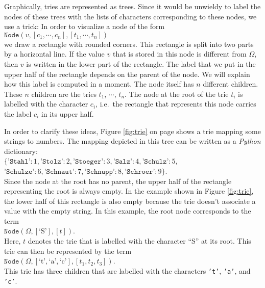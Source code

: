 Graphically, tries are represented as trees.  Since it would be unwieldy to label the nodes of these
trees with the lists of characters corresponding to these nodes, we use a trick:  In order to
visualize a node of the form \\[0.2cm]
\hspace*{1.3cm} 
$\texttt{Node}(v, [c_1, \cdots, c_n], [t_1, \cdots, t_n])$ \\[0.2cm]
we draw a rectangle with rounded corners.  This rectangle is split into two parts by a horizontal line.
If the value  $v$ that is stored in this node is different from $\Omega$, then $v$ is
written in the lower part of the rectangle.  The label that we put in the upper half of the rectangle
depends on the parent of the node.  We will explain how this label is computed in a moment.
The node itself has $n$ different children.  These $n$ children are the tries
$t_1$, $\cdots$, $t_n$.  The node at the root of the trie $t_i$ is labelled with the character $c_i$,
i.e.~the rectangle that represents this node carries the label $c_i$ in its upper half.

In order to clarify these ideas, Figure  \ref{fig:trie} on page \pageref{fig:trie} shows a trie
mapping some strings to numbers.  The mapping depicted in this tree can be written as a \textsl{Python}
dictionary: 
\\[0.2cm]
\hspace*{1.3cm} $ \bigl\{ \texttt{'Stahl'}: 1, \texttt{'Stolz'}: 2, \texttt{'Stoeger'}: 3, \texttt{'Salz'}: 4, \texttt{'Schulz'}: 5$, \\[0.2cm]
\hspace*{1.5cm} $         \texttt{'Schulze'}: 6, \texttt{'Schnaut'}: 7, \texttt{'Schnupp'}: 8, \texttt{'Schroer'}: 9\bigr\}$. \\[0.2cm]
Since the node at the root has no parent, the upper half of  the rectangle representing the root is
always empty.  In the example shown in Figure \ref{fig:trie}, the lower half of this rectangle is also empty
because the trie doesn't associate a value with the empty string.  In this example, the root node corresponds
to the term  
\\[0.2cm]
\hspace*{1.3cm}
 $\texttt{Node}(\Omega,[\textrm{`S'}], [t])$. 
\\[0.2cm]
Here,  $t$ denotes the trie that is labelled with the character  ``S'' at its root.
This trie can then be represented by the term  \\[0.2cm]
\hspace*{1.3cm} 
$\texttt{Node}(\Omega,[\textrm{`t'},\textrm{`a'},\textrm{`c'}], [t_1, t_2, t_3])$. \\[0.2cm]
This trie has three children that are labelled with the characters  \texttt{'t'}, \texttt{'a'}, and \texttt{'c'}.

